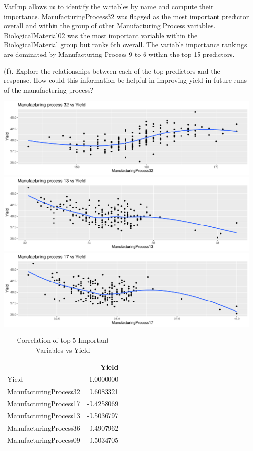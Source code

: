 \documentclass[]{report}
\begin{document}
VarImp allows us to identify the variables by name and compute their
importance. ManufacturingProcess32 was flagged as the most important
predictor overall and within the group of other Manufacturing Process
variables. BiologicalMaterial02 was the most important variable within
the BiologicalMaterial group but ranks 6th overall. The variable
importance rankings are dominated by Manufacturing Process 9 to 6 within
the top 15 predictors.

\begin{subquestion}{(f).} Explore the relationships between each of the top predictors and the response. How could this information be helpful in improving yield in future runs of the manufacturing process?
\end{subquestion}

\includegraphics{Homework-Two_files/figure-latex/kj-6.3f-1.pdf}
\includegraphics{Homework-Two_files/figure-latex/kj-6.3f-2.pdf}
\includegraphics{Homework-Two_files/figure-latex/kj-6.3f-3.pdf}

\begin{table}[H]

\caption{\label{tab:kj-6.3f}Correlation of top 5 Important Variables vs Yield}
\centering
\begin{tabular}[t]{l|r}
\hline
  & Yield\\
\hline
\rowcolor{gray!6}  Yield & 1.0000000\\
\hline
ManufacturingProcess32 & 0.6083321\\
\hline
\rowcolor{gray!6}  ManufacturingProcess17 & -0.4258069\\
\hline
ManufacturingProcess13 & -0.5036797\\
\hline
\rowcolor{gray!6}  ManufacturingProcess36 & -0.4907962\\
\hline
ManufacturingProcess09 & 0.5034705\\
\hline
\end{tabular}
\end{table}
\end{document}
